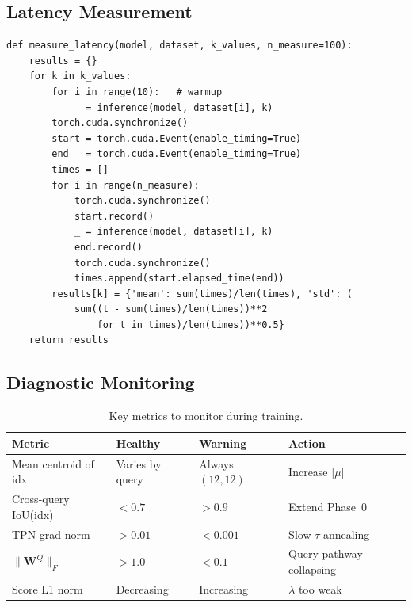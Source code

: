 \documentclass[11pt,a4paper]{article}
\begin{document}
\subsection{Latency Measurement}

\begin{lstlisting}[caption={GPU-accurate latency (measures gather-based inference).}]
def measure_latency(model, dataset, k_values, n_measure=100):
    results = {}
    for k in k_values:
        for i in range(10):   # warmup
            _ = inference(model, dataset[i], k)
        torch.cuda.synchronize()
        start = torch.cuda.Event(enable_timing=True)
        end   = torch.cuda.Event(enable_timing=True)
        times = []
        for i in range(n_measure):
            torch.cuda.synchronize()
            start.record()
            _ = inference(model, dataset[i], k)
            end.record()
            torch.cuda.synchronize()
            times.append(start.elapsed_time(end))
        results[k] = {'mean': sum(times)/len(times), 'std': (
            sum((t - sum(times)/len(times))**2
                for t in times)/len(times))**0.5}
    return results
\end{lstlisting}

\subsection{Diagnostic Monitoring}

\begin{table}[h]
\centering
\caption{Key metrics to monitor during training.}
\label{tab:diagnostics}
\renewcommand{\arraystretch}{1.2}
\small
\begin{tabular}{@{}llll@{}}
  \toprule
  Metric & Healthy & Warning & Action \\
  \midrule
  Mean centroid of idx   & Varies by query & Always $(12,12)$ & Increase $|\mu|$ \\
  Cross-query IoU(idx)   & $<0.7$  & $>0.9$   & Extend Phase~0 \\
  TPN grad norm          & $>0.01$ & $<0.001$ & Slow $\tau$ annealing \\
  $\|\mathbf{W}^Q\|_F$  & $>1.0$  & $<0.1$   & Query pathway collapsing \\
  Score L1 norm          & Decreasing & Increasing & $\lambda$ too weak \\
  \bottomrule
\end{tabular}
\end{table}

\end{document}
